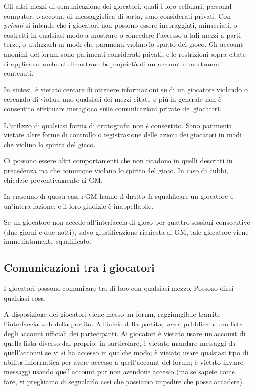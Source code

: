 \documentclass[a4paper,10pt]{article}
\begin{document}
Gli altri mezzi di comunicazione dei giocatori, quali i loro cellulari, personal computer, o account di messaggistica di sorta, sono considerati privati.
Con \emph{privati} si intende che i giocatori non possono essere incoraggiati, minacciati, o costretti in qualsiasi modo a mostrare o concedere l'accesso a tali mezzi a parti terze, o utilizzarli in modi che parimenti violino lo spirito del gioco. Gli account anonimi del forum sono parimenti considerati privati, e le restrizioni sopra citate si applicano anche al dimostrare la proprietà di un account o mostrarne i contenuti.

In sintesi, è vietato cercare di ottenere informazioni su di un giocatore violando o cercando di violare uno qualsiasi dei mezzi citati, e più in generale non è consentito effettuare metagioco sulle comunicazioni private dei giocatori.

L'utilizzo di qualsiasi forma di crittografia non è consentito. Sono parimenti vietate altre forme di controllo o registrazione delle azioni dei giocatori in modi che violino lo spirito del gioco.

Ci possono essere altri comportamenti che non ricadono in quelli descritti in precedenza ma che comunque violano lo spirito del gioco. In caso di dubbi, chiedete preventivamente ai GM.

In ciascuno di questi casi i GM hanno il diritto di squalificare un giocatore o un'intera fazione, e il loro giudizio è inappellabile.

Se un giocatore non accede all'interfaccia di gioco per quattro sessioni consecutive (due giorni e due notti), salvo giustificazione richiesta ai GM, tale giocatore viene immediatamente squalificato.

\subsection{Comunicazioni tra i giocatori}

I giocatori possono comunicare tra di loro con qualsiasi mezzo. Possono dirsi qualsiasi cosa.

A disposizione dei giocatori viene messo un forum, raggiungibile tramite l'interfaccia web della partita.  All'inizio della partita, verrà pubblicata una lista degli account ufficiali dei partecipanti. Ai giocatori è vietato usare un account di quella lista diverso dal proprio: in particolare, è vietato mandare messaggi da quell'account se vi si ha accesso in qualche modo; è vietato usare qualsiasi tipo di abilità informatica per avere accesso a quell'account del forum; è vietato inviare messaggi usando quell'account pur non avendone accesso (ma se sapete come fare, vi preghiamo di segnalarlo così che possiamo impedire che possa accadere).
\end{document}
